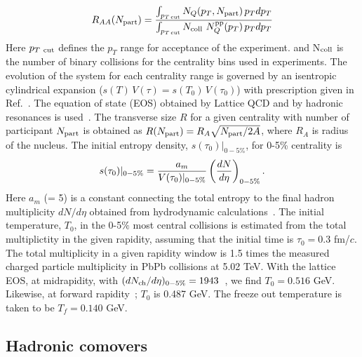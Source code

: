 \documentclass[12pt,a4paper,final]{iopart} %
\newcommand{\npart}{N_{\rm part}}
\begin{document}
\begin{equation}
  R_{AA}(N_{\rm part}) = \frac{\int_{p_{T\,\rm cut}} N_{Q}(p_T, \npart) \, p_T dp_T}
                  {\int_{p_{T\,\rm cut}} N_{\rm coll} \,\, N^{\rm pp}_{Q}(p_T) \, p_T dp_T} 
\label{raa2}
\end{equation}
Here $p_{T~{\rm cut}}$ defines the $p_T$ range for acceptance of the experiment.
and N$_{\rm coll}$ is the number of binary collisions for the centrality bins used in
experiments.
 The evolution of the system for each centrality range is governed by an isentropic
cylindrical expansion ($s(T)\,V(\tau)= s(T_0)\,V(\tau_0)$) with prescription given
in Ref.~\cite{Kumar:2014kfa}.
The equation of state (EOS) obtained by Lattice QCD and by hadronic resonances is
used~\cite{Huovinen:2009yb}. The transverse size $R$ for a given centrality
with number of participant $\npart$ is obtained as $R(\npart) = R_{A} \sqrt{\npart/2A}$,
where $R_{A}$ is radius of the nucleus.
The initial entropy density, $s(\tau_0)|_{0-5\%}$, for 0-5\% centrality is 
\begin{eqnarray}
s(\tau_0)|_{0-5\%}  = {a_{m} \over V(\tau_0)|_{0-5\%}}   \left(\frac{dN}{d\eta}\right)_{0-5\%} . 
\label{TempVsMult}
\end{eqnarray}  
Here $a_m$ (= 5) is a constant connecting the total entropy to the final hadron 
multiplicity $dN/d\eta$ obtained from hydrodynamic calculations~\cite{Shuryak:1992wc}.
The initial temperature, $T_0$, in the 0-5$\%$ most central collisions is estimated 
from the total multiplictity in the given rapidity, assuming that the initial time is
$\tau_0 = 0.3$ fm/$c$. The total multiplicity in a given rapidity window is
1.5 times the measured charged particle multiplicity in PbPb collisions at 5.02 TeV.
With the lattice EOS, at midrapidity, with $(dN_{\rm ch}/d\eta)_{0-5\%} = 1943$~\cite{Adam:2015ptt}, 
we find $T_0 = 0.516$ GeV. Likewise, at forward rapidity~\cite{Adam:2016ddh}; $T_0$ is
0.487 GeV. The freeze out temperature is taken to be $T_f=0.140$ GeV.

\subsection{Hadronic comovers}
\end{document}
